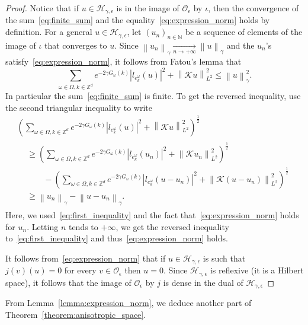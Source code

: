 \documentclass[AHL,Unicode,longabstracts,published]{cedram}
\newcommand{\p}[1]{\left(#1\right)}
\newcommand{\n}[1]{\left\|#1\right\|}
\newcommand{\va}[1]{\left|#1\right|}
\newcommand{\clO}{\mathcal{O}}
\newcommand{\clH}{\mathcal{H}}
\newcommand{\clK}{\mathcal{K}}
\newcommand{\bbZ}{\mathbb{Z}}
\newcommand{\bbN}{\mathbb{N}}
\newcommand{\clO}{\mathcal{O}}
\begin{document}
\begin{proof}
Notice that if $u \in \clH_{\gamma,\epsilon}$ is in the image of $\clO_\epsilon$ by $\iota$, then the convergence of the sum~\eqref{eq:finite_sum} and the equality~\eqref{eq:expression_norm} holds by definition. For a general $u \in \clH_{\gamma,\epsilon}$, let $(u_n)_{n \in \bbN}$ be a sequence of elements of the image of $\iota$ that converges to $u$. Since $\n{u_n}_{\gamma} \underset{n \to + \infty}{\to} \n{u}_\gamma$ and the $u_n$'s satisfy~\eqref{eq:expression_norm}, it follows from Fatou's lemma that
\begin{equation}\label{eq:first_inequality}
\sum_{\omega \in \Omega, k \in \bbZ^d} e^{-2 \gamma G_\omega(k)} \va{l_{e_k^\omega}(u)}^2 + \n{\clK u}_{L^2}^2 \leq \n{u}_\gamma^2.
\end{equation}
In particular the sum~\eqref{eq:finite_sum} is finite. To get the reversed inequality, use the second triangular inequality to write
\begin{multline*}
 \p{\sum_{\omega \in \Omega, k \in \bbZ^d} e^{-2 \gamma G_\omega(k)} \va{l_{e_k^\omega}(u)}^2 + \n{\clK u}_{L^2}^2}^{\frac{1}{2}} \\
\begin{aligned}
& \geq \p{\sum_{\omega \in \Omega, k \in \bbZ^d} e^{-2 \gamma G_\omega(k)} \va{l_{e_k^\omega}(u_n)}^2 + \n{\clK u_n}_{L^2}^2}^{\frac{1}{2}} \\
& \qquad - \p{\sum_{\omega \in \Omega, k \in \bbZ^d} e^{-2 \gamma G_\omega(k)} \va{l_{e_k^\omega}(u - u_n)}^2 + \n{\clK (u-u_n)}_{L^2}^2}^{\frac{1}{2}}\\
& \geq \n{u_n}_\gamma - \n{u-u_n}_\gamma.
\end{aligned}
\end{multline*}
Here, we used~\eqref{eq:first_inequality} and the fact that~\eqref{eq:expression_norm} holds for $u_n$. Letting $n$ tends to $+ \infty$, we get the reversed inequality to~\eqref{eq:first_inequality} and thus~\eqref{eq:expression_norm} holds.

It follows from~\eqref{eq:expression_norm} that if $u \in \clH_{\gamma,\epsilon}$ is such that $j(v)(u) = 0$ for every $v \in \clO_{\epsilon}$ then $u = 0$. Since $\clH_{\gamma,\epsilon}$ is reflexive (it is a Hilbert space), it follows that the image of $\clO_\epsilon$ by $j$ is dense in the dual of $\clH_{\gamma,\epsilon}$
\end{proof}

From Lemma~\ref{lemma:expression_norm}, we deduce another part of Theorem~\ref{theorem:anisotropic_space}.
\end{document}
